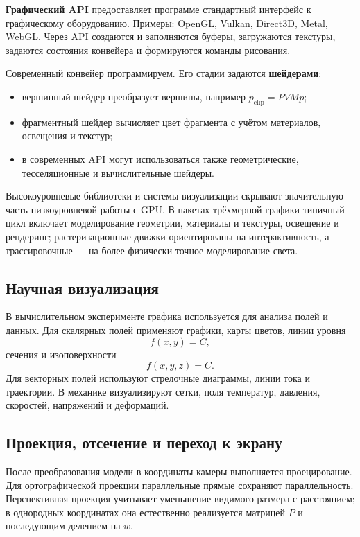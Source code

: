 \textbf{Графический API} предоставляет программе стандартный интерфейс к графическому оборудованию. Примеры: OpenGL, Vulkan, Direct3D, Metal, WebGL. Через API создаются и заполняются буферы, загружаются текстуры, задаются состояния конвейера и формируются команды рисования.

Современный конвейер программируем. Его стадии задаются \textbf{шейдерами}:
\begin{itemize}
\item вершинный шейдер преобразует вершины, например $p_{\mathrm{clip}}=PVMp$;
\item фрагментный шейдер вычисляет цвет фрагмента с учётом материалов, освещения и текстур;
\item в современных API могут использоваться также геометрические, тесселяционные и вычислительные шейдеры.
\end{itemize}

Высокоуровневые библиотеки и системы визуализации скрывают значительную часть низкоуровневой работы с GPU. В пакетах трёхмерной графики типичный цикл включает моделирование геометрии, материалы и текстуры, освещение и рендеринг; растеризационные движки ориентированы на интерактивность, а трассировочные --- на более физически точное моделирование света.

\subsection{Научная визуализация}

В вычислительном эксперименте графика используется для анализа полей и данных. Для скалярных полей применяют графики, карты цветов, линии уровня
\[
f(x,y)=C,
\]
сечения и изоповерхности
\[
f(x,y,z)=C.
\]
Для векторных полей используют стрелочные диаграммы, линии тока и траектории. В механике визуализируют сетки, поля температур, давления, скоростей, напряжений и деформаций.


\subsection{Проекция, отсечение и переход к экрану}

После преобразования модели в координаты камеры выполняется проецирование.
Для ортографической проекции параллельные прямые сохраняют параллельность.
Перспективная проекция учитывает уменьшение видимого размера с расстоянием;
в однородных координатах она естественно реализуется матрицей $P$ и
последующим делением на $w$.

